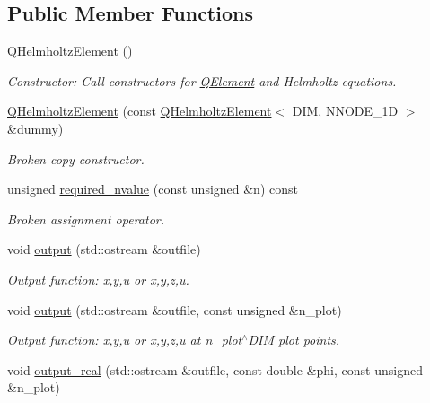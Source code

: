 \subsection*{Public Member Functions}
\begin{DoxyCompactItemize}
\item 
\hyperlink{classoomph_1_1QHelmholtzElement_a94fe2070858865e831825c4a0ca4c501}{Q\+Helmholtz\+Element} ()
\begin{DoxyCompactList}\small\item\em Constructor\+: Call constructors for \hyperlink{classoomph_1_1QElement}{Q\+Element} and Helmholtz equations. \end{DoxyCompactList}\item 
\hyperlink{classoomph_1_1QHelmholtzElement_a589e3ccd70828be0777a15ebae315965}{Q\+Helmholtz\+Element} (const \hyperlink{classoomph_1_1QHelmholtzElement}{Q\+Helmholtz\+Element}$<$ D\+IM, N\+N\+O\+D\+E\+\_\+1D $>$ \&dummy)
\begin{DoxyCompactList}\small\item\em Broken copy constructor. \end{DoxyCompactList}\item 
unsigned \hyperlink{classoomph_1_1QHelmholtzElement_aacbd4741d254660373226d447e508eae}{required\+\_\+nvalue} (const unsigned \&n) const
\begin{DoxyCompactList}\small\item\em Broken assignment operator. \end{DoxyCompactList}\item 
void \hyperlink{classoomph_1_1QHelmholtzElement_ab64bdf668cacf69003ddc36832b29559}{output} (std\+::ostream \&outfile)
\begin{DoxyCompactList}\small\item\em Output function\+: x,y,u or x,y,z,u. \end{DoxyCompactList}\item 
void \hyperlink{classoomph_1_1QHelmholtzElement_ac05323b02dc7d06f506ade8078fa2356}{output} (std\+::ostream \&outfile, const unsigned \&n\+\_\+plot)
\begin{DoxyCompactList}\small\item\em Output function\+: x,y,u or x,y,z,u at n\+\_\+plot$^\wedge$\+D\+IM plot points. \end{DoxyCompactList}\item 
void \hyperlink{classoomph_1_1QHelmholtzElement_a60e27818eabd8a5ebf9328a97b89b2b3}{output\+\_\+real} (std\+::ostream \&outfile, const double \&phi, const unsigned \&n\+\_\+plot)

\end{DoxyCompactItemize}
